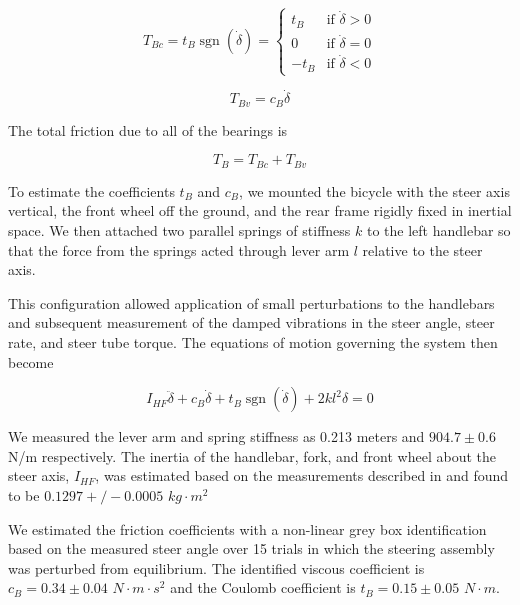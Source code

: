 \documentclass[a4paper]{article}
\begin{document}
\begin{equation}
  T_{Bc} = t_B \operatorname{sgn}(\dot\delta) =
  \begin{cases}
    t_B  & \textrm{if $\dot{\delta}>0$}\\
    0    & \textrm{if $\dot{\delta}=0$}\\
    -t_B & \textrm{if $\dot{\delta}<0$}
  \end{cases}
  \label{eq:coulomb}
\end{equation}

\begin{equation}
  \label{eq:viscous}
  T_{Bv} = c_B \dot{\delta}
\end{equation}

The total friction due to all of the bearings is

\begin{equation}
  T_B = T_{Bc} + T_{Bv}
\end{equation}

To estimate the coefficients $t_B$ and $c_B$, we mounted the bicycle with
the steer axis vertical, the front wheel off the ground, and the rear
frame rigidly fixed in inertial space. We then attached two parallel springs of 
stiffness $k$ to the left handlebar so that the force from the
springs acted through lever arm $l$ relative to the steer axis.

This configuration allowed application of small perturbations to the handlebars
and subsequent measurement of the damped vibrations in the steer angle, steer rate, and steer
tube torque. The equations of motion governing the system then become

\begin{equation}
  I_{HF} \ddot{\delta} + c_B \dot{\delta} + t_B
  \operatorname{sgn}(\dot{\delta}) + 2 k l^2 \delta = 0
\end{equation}

We measured the lever arm and spring stiffness as 0.213 meters and $904.7 \pm
0.6$ N/m respectively. The inertia of the handlebar, fork, and front wheel
about the steer axis, $I_{HF}$, was estimated based on the measurements
described in \cite{Moore2012} and found to be $0.1297+/-0.0005$ $kg\cdot m^2$

We estimated the friction coefficients with a non-linear grey box
identification based on the measured steer angle over 15 trials in which the
steering assembly was perturbed from equilibrium. The identified viscous
coefficient is $c_B = 0.34 \pm 0.04$ $N \cdot m \cdot s^2$ and the Coulomb
coefficient is $t_B = 0.15 \pm 0.05$ $N \cdot m$.
\end{document}
